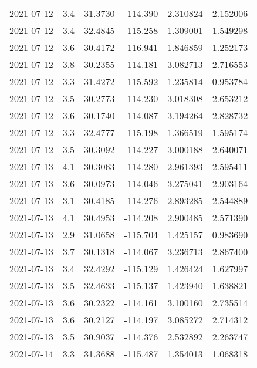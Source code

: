 \begin{tabular}{lrrrrr}
2021-07-12 &       3.4 &  31.3730 &  -114.390 &         2.310824 &         2.152006 \\
2021-07-12 &       3.4 &  32.4845 &  -115.258 &         1.309001 &         1.549298 \\
2021-07-12 &       3.6 &  30.4172 &  -116.941 &         1.846859 &         1.252173 \\
2021-07-12 &       3.8 &  30.2355 &  -114.181 &         3.082713 &         2.716553 \\
2021-07-12 &       3.3 &  31.4272 &  -115.592 &         1.235814 &         0.953784 \\
2021-07-12 &       3.5 &  30.2773 &  -114.230 &         3.018308 &         2.653212 \\
2021-07-12 &       3.6 &  30.1740 &  -114.087 &         3.194264 &         2.828732 \\
2021-07-12 &       3.3 &  32.4777 &  -115.198 &         1.366519 &         1.595174 \\
2021-07-12 &       3.5 &  30.3092 &  -114.227 &         3.000188 &         2.640071 \\
2021-07-13 &       4.1 &  30.3063 &  -114.280 &         2.961393 &         2.595411 \\
2021-07-13 &       3.6 &  30.0973 &  -114.046 &         3.275041 &         2.903164 \\
2021-07-13 &       3.1 &  30.4185 &  -114.276 &         2.893285 &         2.544889 \\
2021-07-13 &       4.1 &  30.4953 &  -114.208 &         2.900485 &         2.571390 \\
2021-07-13 &       2.9 &  31.0658 &  -115.704 &         1.425157 &         0.983690 \\
2021-07-13 &       3.7 &  30.1318 &  -114.067 &         3.236713 &         2.867400 \\
2021-07-13 &       3.4 &  32.4292 &  -115.129 &         1.426424 &         1.627997 \\
2021-07-13 &       3.5 &  32.4633 &  -115.137 &         1.423940 &         1.638821 \\
2021-07-13 &       3.6 &  30.2322 &  -114.161 &         3.100160 &         2.735514 \\
2021-07-13 &       3.6 &  30.2127 &  -114.197 &         3.085272 &         2.714312 \\
2021-07-13 &       3.5 &  30.9037 &  -114.376 &         2.532892 &         2.263747 \\
2021-07-14 &       3.3 &  31.3688 &  -115.487 &         1.354013 &         1.068318 \\

\end{tabular}
